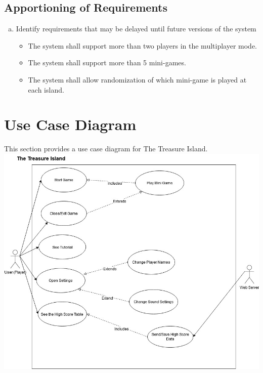 \documentclass[]{article}
\begin{document}
\subsection{Apportioning of Requirements}
\label{sub:apportioning_of_requirements}
\begin{enumerate}[a)]
	\item Identify requirements that may be delayed until future versions of the system
	\begin{itemize}
	    \item The system shall support more than two players in the multiplayer mode.
	    \item The system shall support more than 5 mini-games. 
	    \item The system shall allow randomization of which mini-game is played at each island. 
    \end{itemize}
\end{enumerate}


\section{Use Case Diagram}
\label{sec:use_case_diagram}
This section provides a use case diagram for The Treasure Island.\\

\includegraphics[width=\textwidth]{3A04UsecaseDiagram.jpg}\\\\
\end{document}
